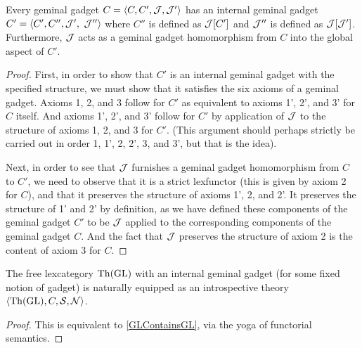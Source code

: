 \begin{theorem}\label{GLContainsGL}
Every geminal gadget $C = \langle C, C', \mathcal{J}, \mathcal{J}'\rangle$ has an internal geminal gadget $C' = \langle C', C'', \mathcal{J}',$ $\mathcal{J}''\rangle$ where $C''$ is defined as $\mathcal{J}[C']$ and $\mathcal{J}''$ is defined as $\mathcal{J}[\mathcal{J}']$. Furthermore, $\mathcal{J}$ acts as a geminal gadget homomorphism from $C$ into the global aspect of $C'$.
\end{theorem}
\begin{proof}
First, in order to show that $C'$ is an internal geminal gadget with the specified structure, we must show that it satisfies the six axioms of a geminal gadget. Axioms 1, 2, and 3 follow for $C'$ as equivalent to axioms 1', 2', and 3' for $C$ itself. And axioms 1', 2', and 3' follow for $C'$ by application of $\mathcal{J}$ to the structure of axioms 1, 2, and 3 for $C'$. (This argument should perhaps strictly be carried out in order 1, 1', 2, 2', 3, and 3', but that is the idea).

Next, in order to see that $\mathcal{J}$ furnishes a geminal gadget homomorphism from $C$ to $C'$, we need to observe that it is a strict lexfunctor (this is given by axiom 2 for $C$), and that it preserves the structure of axioms 1', 2, and 2'. It preserves the structure of 1' and 2' by definition, as we have defined these components of the geminal gadget $C'$ to be $\mathcal{J}$ applied to the corresponding components of the geminal gadget $C$. And the fact that $\mathcal{J}$ preserves the structure of axiom 2 is the content of axiom 3 for $C$.
\end{proof}

\begin{corollary}\label{GLCatTheoryIsIntrosp}
The free lexcategory $\mathrm{Th}(\mathrm{GL})$ with an internal geminal gadget (for some fixed notion of gadget) is naturally equipped as an introspective theory $\langle \mathrm{Th}(\mathrm{GL}), C, \mathcal{S}, \mathcal{N} \rangle$.
\end{corollary}
\begin{proof}
This is equivalent to \cref{GLContainsGL}, via the yoga of functorial semantics.
\end{proof}


